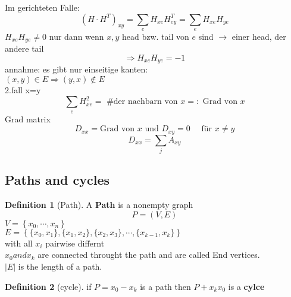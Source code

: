 \documentclass[a4paper]{article}
\theoremstyle{definition}
\newtheorem*{definition}{Definition}
\theoremstyle{remark}
\begin{document}
Im gerichteten Falle:\\
\begin{equation}
  (H\cdot H^{T})_{xy}= \sum_{e} H_{xe}H^{T}_{ey}= \sum_e H_{xe}H_{ye}
\end{equation}
$H_{xe}H_{ye}\neq 0$ nur dann wenn $x,y$ head bzw. tail von $e$ sind $\rightarrow $ einer head, der andere tail 
\begin{equation}
  \Rightarrow H_{xe}H_{ye}=-1
\end{equation}
annahme: es gibt nur einseitige kanten:\\
$(x,y)\in E \Rightarrow (y,x) \notin E$\\
2.fall x=y\\
\begin{equation}
\sum_e H_{xe}^2= \textrm{ \# der nachbarn von }x  =: \textrm{ Grad von } x 
\end{equation}
Grad matrix  
\begin{equation}
D_{xx}= \textrm{Grad von }x \textrm{ und } D_{xy}=0 \quad \textrm{ für } x\neq y
\end{equation}
\begin{equation}
  D_{xx}= \sum_j A_{xy}
\end{equation}
\subsection{Paths and cycles}
\label{sub:paths_and_cycles}
\begin{definition}[Path]
	A \textbf{Path } is a nonempty graph 
\begin{equation}
  P=(V,E)
\end{equation}
$V=\left\{ x_0,\cdots,x_n \right\}$\\
$E=\left\{ \{ x_0,x_1 \},\{x_1,x_2\},\{x_2,x_3\},\cdots,\{x_{k-1},x_k\} \right\}$\\
with all $x_i$ pairwise differnt\\
	$x_0 and x_k$ are connected throught the path and are called End vertices.\\
	$|E|$ is the length of a path.\\
\end{definition}
\begin{definition}[cycle]
  if $P=x_0-x_k$  is a path then $P+x_kx_0$ is a \textbf{cylce}\\
\end{definition}
\end{document}
